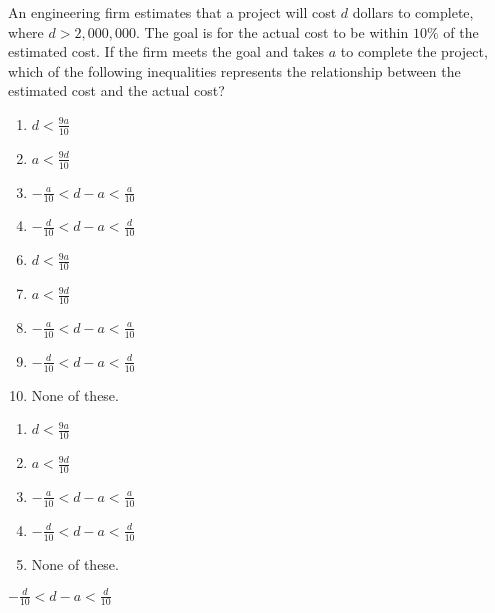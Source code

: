  
An engineering firm estimates that a project will cost $d$ dollars to complete, where $d>2,000,000$.  The goal is for the actual cost to be within $10\%$ of the estimated cost.  If the firm meets the goal and takes $a$ to complete the project, which of the following inequalities represents the relationship between the estimated cost and the actual cost?


\ifsat
	\begin{enumerate}[label=\Alph*)]
		\item $d<\frac{9a}{10} $ 
		\item $a<\frac{9d}{10} $ 
		\item $-\frac{a}{10}<d-a<\frac{a}{10} $ 
		\item $-\frac{d}{10}<d-a<\frac{d}{10} $ %
	\end{enumerate}
\else
\fi

\ifacteven
	\begin{enumerate}[label=\textbf{\Alph*.},itemsep=\fill,align=left]
		\setcounter{enumii}{5}
		\item $d<\frac{9a}{10} $ 
		\item $a<\frac{9d}{10} $ 
		\item $-\frac{a}{10}<d-a<\frac{a}{10} $ 
		\addtocounter{enumii}{1}
		\item $-\frac{d}{10}<d-a<\frac{d}{10} $ %
		\item None of these. 
	\end{enumerate}
\else
\fi

\ifactodd
	\begin{enumerate}[label=\textbf{\Alph*.},itemsep=\fill,align=left]
		\item $d<\frac{9a}{10} $ 
		\item $a<\frac{9d}{10} $ 
		\item $-\frac{a}{10}<d-a<\frac{a}{10} $ 
		\item $-\frac{d}{10}<d-a<\frac{d}{10} $ %
		\item None of these. 
	\end{enumerate}
\else
\fi

\ifgridin
 $-\frac{d}{10}<d-a<\frac{d}{10} $ %

\else
\fi

